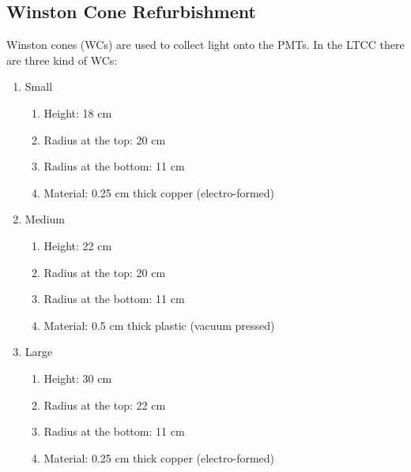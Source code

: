 \subsection{Winston Cone Refurbishment}

Winston cones (WCs) are used to collect light onto the PMTs. In the LTCC there are three kind of WCs:

\begin{enumerate}

\item Small
	\begin{enumerate}
		\item Height: 18 cm
		\item Radius at the top: 20 cm
		\item Radius at the bottom: 11 cm
		\item Material: 0.25 cm thick copper (electro-formed)
	\end{enumerate}

	\item Medium
	\begin{enumerate}
		\item Height: 22 cm
		\item Radius at the top: 20 cm
		\item Radius at the bottom: 11 cm
		\item Material: 0.5 cm thick plastic (vacuum pressed)
	\end{enumerate}

	\item Large
	\begin{enumerate}
		\item Height: 30 cm
		\item Radius at the top: 22 cm
		\item Radius at the bottom: 11 cm
		\item Material: 0.25 cm thick copper (electro-formed)
	\end{enumerate}
\end{enumerate}

